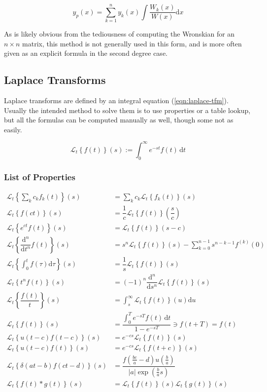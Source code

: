 \documentclass[12pt]{article}
\newcommand \dstyle \displaystyle
\newcommand \Laplace [3] {\ensuremath{\mathscr{L}_{#1}\!\left\{#2\right\}\!\left(#3\right)}}
\renewcommand \d [1] {\mathrm{d}{#1}}
\newcommand \dt {{\d t}}
\newcommand \du {{\d u}}
\newcommand \dx {{\d x}}
\newcommand \ddn [2] {\dfrac{\mathrm{d}^{#2}}{\d{#1}^{#2}}}
\begin{document}
\begin{equation}
	y_p(x) = \sum_{k=1}^n y_k(x) \int \dfrac{W_k(x)}{W(x)} \dx
\end{equation}

As is likely obvious from the tediousness of computing the Wronskian for an $n \times n$ matrix, this method is not generally used in this form, and is more often given as an explicit formula in the second degree case.

\subsection{Laplace Transforms}

Laplace transforms are defined by an integral equation (\ref{eqn:laplace-tfm}). Usually the intended method to solve them is to use properties or a table lookup, but all the formulas can be computed manually as well, though some not as easily.

\begin{equation}\label{eqn:laplace-tfm}
	\Laplace{t}{f(t)}{s} := \int_0^\infty \!\! e^{-st} f(t) \, \dt
\end{equation}

\subsubsection{List of Properties}\label{sec:laplace-properties}

\begin{align}
	\Laplace{t}{\sum_k c_k f_k(t)}{s} & = \sum_k c_k \Laplace{t}{f_k(t)}{s} \\
	\Laplace{t}{f(ct)}{s} & = \dfrac 1 c \Laplace{t}{f(t)}{\dfrac s c} \\
	\Laplace{t}{e^{c t} f(t)}{s} & = \Laplace{t}{f(t)}{s - c} \\ 
	\Laplace{t}{\ddn t n f(t)}{s} & = s^n \Laplace{t}{f(t)}{s} - \sum_{k = 0}^{n - 1} s^{n - k - 1} f^{(k)}(0) \\
	\Laplace{t}{\int_0^t f(\tau) \d\tau}{s} & = \dfrac 1 s \Laplace{t}{f(t)}{s} \\
	\Laplace{t}{t^n f(t)}{s} & = (-1)^n \ddn s n \Laplace{t}{f(t)}{s} \\
	\Laplace{t}{\dfrac {f(t)} t}{s} & = \int_s^\infty \Laplace{t}{f(t)}{u} \du \\
	\Laplace{t}{f(t)}{s} & = \dfrac {\int_0^T \! e^{-sT} f(t) \, \dt} {\dstyle 1 - e^{-s T}} \ni f(t + T) = f(t) \\
	\Laplace{t}{u(t - c) f(t - c)}{s} & = e^{-c s} \Laplace{t}{f(t)}{s} \\
	\Laplace{t}{u(t - c) f(t)}{s} & = e^{-c s} \Laplace{t}{f(t + c)}{s} \\
	\Laplace{t}{\delta(at - b) f(ct - d)}{s} & = \dfrac{f\!\left(\tfrac{b c} a - d\right) u\! \left(\tfrac b a\right)}{|a| \exp\!\left(\tfrac b a s\right)} \\
	\Laplace{t}{f(t) * g(t)}{s} & = \Laplace{t}{f(t)}{s} \Laplace{t}{g(t)}{s}
\end{align}
\end{document}
